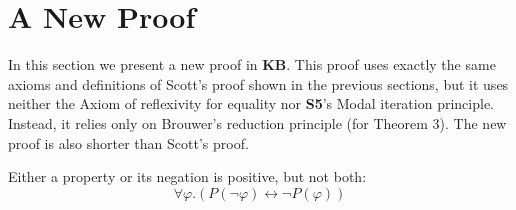 \documentclass[smallextended]{svjour3}
\newcommand{\biimp}{\leftrightarrow}
\newcommand{\all}{\forall}
\begin{document}
\section{A New Proof}\label{sec:newproof}

In this section we present a new proof in {\bf KB}. This proof uses exactly the same axioms and definitions of Scott's proof shown in the previous sections, but it uses neither the Axiom of reflexivity for equality nor {\bf S5}'s Modal iteration principle. Instead, it relies only on Brouwer's reduction principle (for Theorem 3). The new proof is also shorter than Scott's proof. 



\setcounter{axiom}{0}
\setcounter{lemma}{0}
\setcounter{theorem}{0}
\setcounter{corollary}{0}
\setcounter{definition}{0}


\begin{axiom}
\label{N:A1}
Either a property or its negation is positive, but not both:
$$
\all \varphi. (P(\neg \varphi) \biimp \neg P(\varphi))
$$
\end{axiom}
\end{document}
